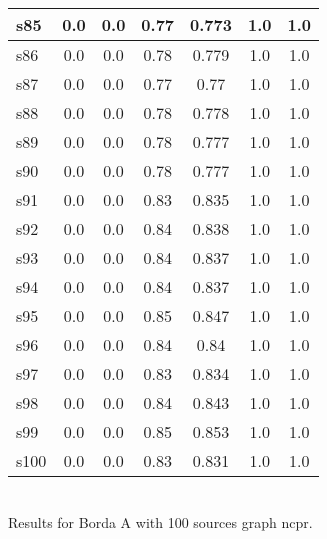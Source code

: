 \documentclass{article}
\begin{document}
\begin{tabular}{|l|c|c|c|c|c|c|}
\hline
s85 &0.0 & 0.0 & 0.77 & 0.773 & 1.0 & 1.0\\
\hline
s86 &0.0 & 0.0 & 0.78 & 0.779 & 1.0 & 1.0\\
\hline
s87 &0.0 & 0.0 & 0.77 & 0.77 & 1.0 & 1.0\\
\hline
s88 &0.0 & 0.0 & 0.78 & 0.778 & 1.0 & 1.0\\
\hline
s89 &0.0 & 0.0 & 0.78 & 0.777 & 1.0 & 1.0\\
\hline
s90 &0.0 & 0.0 & 0.78 & 0.777 & 1.0 & 1.0\\
\hline
s91 &0.0 & 0.0 & 0.83 & 0.835 & 1.0 & 1.0\\
\hline
s92 &0.0 & 0.0 & 0.84 & 0.838 & 1.0 & 1.0\\
\hline
s93 &0.0 & 0.0 & 0.84 & 0.837 & 1.0 & 1.0\\
\hline
s94 &0.0 & 0.0 & 0.84 & 0.837 & 1.0 & 1.0\\
\hline
s95 &0.0 & 0.0 & 0.85 & 0.847 & 1.0 & 1.0\\
\hline
s96 &0.0 & 0.0 & 0.84 & 0.84 & 1.0 & 1.0\\
\hline
s97 &0.0 & 0.0 & 0.83 & 0.834 & 1.0 & 1.0\\
\hline
s98 &0.0 & 0.0 & 0.84 & 0.843 & 1.0 & 1.0\\
\hline
s99 &0.0 & 0.0 & 0.85 & 0.853 & 1.0 & 1.0\\
\hline
s100 &0.0 & 0.0 & 0.83 & 0.831 & 1.0 & 1.0\\
\hline
\end{tabular}\\

\noindent Results for Borda A with 100 sources graph ncpr.
\end{document}
